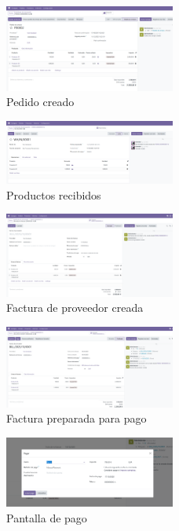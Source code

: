 \documentclass[a4paper,12pt]{article}
\begin{document}
\begin{figure}[h!]
    \centering
    \includegraphics[width=0.5\textwidth]{pr2odoo30-pedidoCreado.png}
    \caption{Pedido creado}
\end{figure}
\FloatBarrier

\begin{figure}[h!]
    \centering
    \includegraphics[width=0.5\textwidth]{pr2odoo31-productosRecibidos.png}
    \caption{Productos recibidos}
\end{figure}
\FloatBarrier

\begin{figure}[h!]
    \centering
    \includegraphics[width=0.5\textwidth]{pr2odoo32-facturaProveedorCreada.png}
    \caption{Factura de proveedor creada}
\end{figure}
\FloatBarrier

\begin{figure}[h!]
    \centering
    \includegraphics[width=0.5\textwidth]{pr2odoo33-preparadaParaPago.png}
    \caption{Factura preparada para pago}
\end{figure}
\FloatBarrier

\begin{figure}[h!]
    \centering
    \includegraphics[width=0.5\textwidth]{pr2odoo34-pantallaPago.png}
    \caption{Pantalla de pago}
\end{figure}
\FloatBarrier
\end{document}
